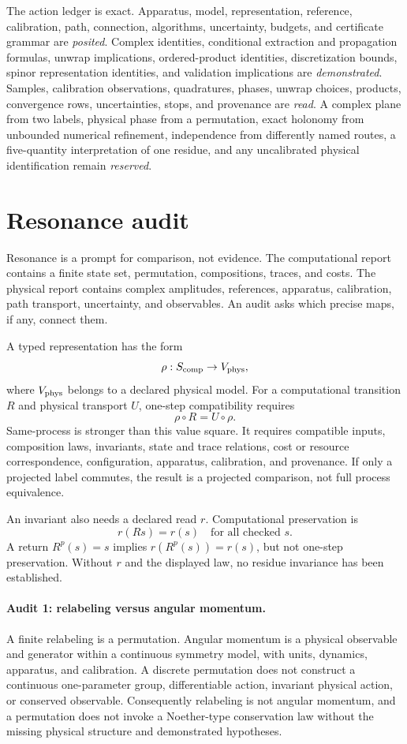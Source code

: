 The action ledger is exact.  Apparatus, model, representation, reference, calibration, path, connection, algorithms,
uncertainty, budgets, and certificate grammar are \emph{posited}.  Complex identities, conditional extraction and
propagation formulas, unwrap implications, ordered-product identities, discretization bounds, spinor representation
identities, and validation implications are \emph{demonstrated}.  Samples, calibration observations, quadratures,
phases, unwrap choices, products, convergence rows, uncertainties, stops, and provenance are \emph{read}.  A complex
plane from two labels, physical phase from a permutation, exact holonomy from unbounded numerical refinement,
independence from differently named routes, a five-quantity interpretation of one residue, and any uncalibrated
physical identification remain \emph{reserved}.
\section{Resonance audit}

Resonance is a prompt for comparison, not evidence.  The computational report contains a finite state set,
permutation, compositions, traces, and costs.  The physical report contains complex amplitudes, references, apparatus,
calibration, path transport, uncertainty, and observables.  An audit asks which precise maps, if any, connect them.

A typed representation has the form
\[
\rho:S_{\rm comp}\to V_{\rm phys},
\]
where \(V_{\rm phys}\) belongs to a declared physical model.  For a computational transition \(R\) and physical
transport \(U\), one-step compatibility requires
\[
                         \rho\circ R=U\circ\rho.
\]
Same-process is stronger than this value square.  It requires compatible inputs, composition laws, invariants,
state and trace relations, cost or resource correspondence, configuration, apparatus, calibration, and provenance.
If only a projected label commutes, the result is a projected comparison, not full process equivalence.

An invariant also needs a declared read \(r\).  Computational preservation is
\[
                         r(Rs)=r(s)\quad\text{for all checked }s.
\]
A return \(R^p(s)=s\) implies \(r(R^p(s))=r(s)\), but not one-step preservation.  Without \(r\) and the displayed
law, no residue invariance has been established.

\paragraph{Audit 1: relabeling versus angular momentum.}
A finite relabeling is a permutation.  Angular momentum is a physical observable and generator within a continuous
symmetry model, with units, dynamics, apparatus, and calibration.  A discrete permutation does not construct a
continuous one-parameter group, differentiable action, invariant physical action, or conserved observable.
Consequently relabeling is not angular momentum, and a permutation does not invoke a Noether-type conservation law
without the missing physical structure and demonstrated hypotheses.

